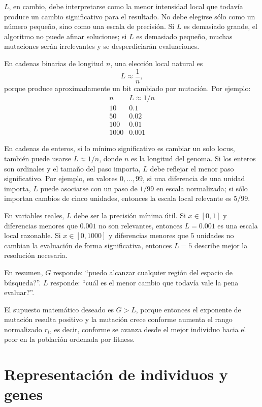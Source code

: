 \documentclass[11pt]{article}
\begin{document}
\(L\), en cambio, debe interpretarse como la menor intensidad local que todav\'ia
produce un cambio significativo para el resultado. No debe elegirse s\'olo como
un n\'umero peque\~no, sino como una escala de precisi\'on. Si \(L\) es demasiado
grande, el algoritmo no puede afinar soluciones; si \(L\) es demasiado peque\~no,
muchas mutaciones ser\'an irrelevantes y se desperdiciar\'an evaluaciones.

En cadenas binarias de longitud \(n\), una elecci\'on local natural es
\[
L \approx \frac{1}{n},
\]
porque produce aproximadamente un bit cambiado por mutaci\'on. Por ejemplo:
\[
\begin{array}{c|c}
n & L \approx 1/n \\
\hline
10 & 0.1 \\
50 & 0.02 \\
100 & 0.01 \\
1000 & 0.001
\end{array}
\]

En cadenas de enteros, si lo m\'inimo significativo es cambiar un solo locus,
tambi\'en puede usarse \(L\approx 1/n\), donde \(n\) es la longitud del genoma.
Si los enteros son ordinales y el tama\~no del paso importa, \(L\) debe reflejar
el menor paso significativo. Por ejemplo, en valores \(0,\dots,99\), si una
diferencia de una unidad importa, \(L\) puede asociarse con un paso de \(1/99\)
en escala normalizada; si s\'olo importan cambios de cinco unidades, entonces
la escala local relevante es \(5/99\).

En variables reales, \(L\) debe ser la precisi\'on m\'inima \'util. Si
\(x\in[0,1]\) y diferencias menores que \(0.001\) no son relevantes, entonces
\(L=0.001\) es una escala local razonable. Si \(x\in[0,1000]\) y diferencias
menores que \(5\) unidades no cambian la evaluaci\'on de forma significativa,
entonces \(L=5\) describe mejor la resoluci\'on necesaria.

En resumen, \(G\) responde: ``\textquestiondown puedo alcanzar cualquier regi\'on
del espacio de b\'usqueda?''. \(L\) responde: ``\textquestiondown cu\'al es el
menor cambio que todav\'ia vale la pena evaluar?''.

El supuesto matem\'atico deseado es \(G > L\), porque entonces el exponente de
mutaci\'on resulta positivo y la mutaci\'on crece conforme aumenta el rango
normalizado \(r_i\), es decir, conforme se avanza desde el mejor individuo hacia
el peor en la poblaci\'on ordenada por fitness.

\section{Representaci\'on de individuos y genes}
\end{document}
